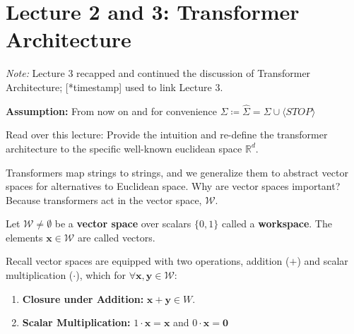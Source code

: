\documentclass[12pt, twoside]{article}
\begin{document}
\newpage


\thispagestyle{RemoveHeader}

\section*{Lecture 2 and 3: Transformer Architecture}

\textit{Note:} Lecture 3 recapped and continued the discussion of Transformer Architecture; [*timestamp] used to link Lecture 3.

\textbf{Assumption:} From now on and for convenience $\Sigma \coloneqq \hat{\Sigma}=\Sigma \cup \langle STOP\rangle$

\begin{exercise} \label{ex:2.1}
    Read over this lecture: Provide the intuition and re-define the transformer architecture to the specific well-known euclidean space $\mathbb{R}^d$.
\end{exercise}

Transformers map strings to strings, and we generalize them to abstract vector spaces for alternatives to Euclidean space. Why are vector spaces important? Because transformers act in the vector space, $\mathcal{W}$.

\begin{definition}[Workspace]
Let $\mathcal{W} \neq \emptyset$ be a \textbf{vector space} over scalars $\{0, 1\}$ called a \textbf{workspace}. The elements $\mathbf{x} \in \mathcal{W}$ are called vectors.

Recall vector spaces are equipped with two operations, addition ($+$) and scalar multiplication ($\cdot$), which for $\forall \mathbf{x}, \mathbf{y} \in \mathcal{W}$:
\begin{enumerate}
    \item \textbf{Closure under Addition:} $\mathbf{x} + \mathbf{y} \in W$.
    \item \textbf{Scalar Multiplication:} $1 \cdot \mathbf{x} = \mathbf{x}$ and $0 \cdot \mathbf{x} = \mathbf{0}$
\end{enumerate}
\end{definition}
\end{document}
